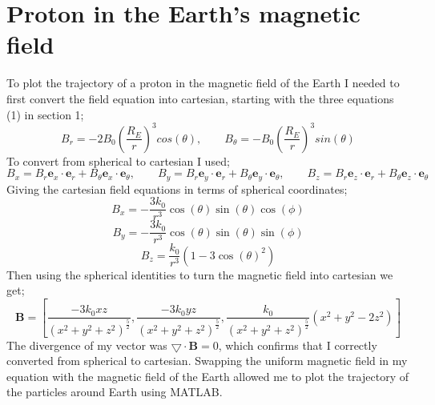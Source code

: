 \documentclass[14paper,11pt,hidelinks]{article}
\begin{document}
\section{Proton in the Earth's magnetic field} 
To plot the trajectory of a proton in the magnetic field of the Earth I needed to first convert the field equation into cartesian, starting with the three equations (1) in section 1; 
\begin{equation}
B_r=-2B_0\left(\frac{R_E}{r}\right)^3cos(\theta),
\qquad 
B_\theta=-B_0\left(\frac{R_E}{r}\right)^3sin(\theta)
\end{equation} 
To convert from spherical to cartesian I used;
\begin{equation} 
B_x=B_r\mathbf{e}_x\cdot\mathbf{e}_r+B_{\theta}\mathbf{e}_x\cdot\mathbf{e}_{\theta},
\qquad
B_y=B_r\mathbf{e}_y\cdot\mathbf{e}_r+B_{\theta}\mathbf{e}_y\cdot\mathbf{e}_{\theta},
\qquad
B_z=B_r\mathbf{e}_z\cdot\mathbf{e}_r+B_{\theta}\mathbf{e}_z\cdot\mathbf{e}_{\theta}
\end{equation}
Giving the cartesian field equations in terms of spherical coordinates;
\begin{equation}
B_x=-\frac{3k_0}{r^3}\cos(\theta)\sin(\theta)\cos(\phi)
\end{equation}
\begin{equation}
B_y=-\frac{3k_0}{r^3}\cos(\theta)\sin(\theta)\sin(\phi)
\end{equation}
\begin{equation}
B_z=\frac{k_0}{r^3}\left(1-3\cos(\theta)^2\right)
\end{equation}
Then using the spherical identities to turn the magnetic field into cartesian we get;
\begin{equation}
\mathbf{B}=\left[\frac{-3k_0xz}{(x^2+y^2+z^2)^\frac{5}{2}},\frac{-3k_0yz}{(x^2+y^2+z^2)^\frac{5}{2}},\frac{k_0}{(x^2+y^2+z^2)^\frac{5}{2}}(x^2+y^2-2z^2)\right]
\end{equation}
The divergence of my vector was \begin{math} \bigtriangledown\cdot\mathbf{B}=0 \end{math}, which confirms that I correctly converted from spherical to cartesian. Swapping the uniform magnetic field in my equation with the magnetic field of the Earth allowed me to plot the trajectory of the particles around Earth using MATLAB.


\end{document}

